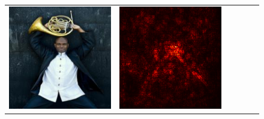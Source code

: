 \documentclass[preprint,12pt]{elsarticle}
\begin{document}
\begin{figure}[p]
\begin{tabular}{cccccc}
  \includegraphics[scale=\scale]{../visualizations/examples/imagenette/resnet18/images/7.png} &
  \includegraphics[scale=\scale]{../visualizations/examples/imagenette/resnet18/saliency_map/7.png} & 

\end{tabular}
\end{figure}
\end{document}

